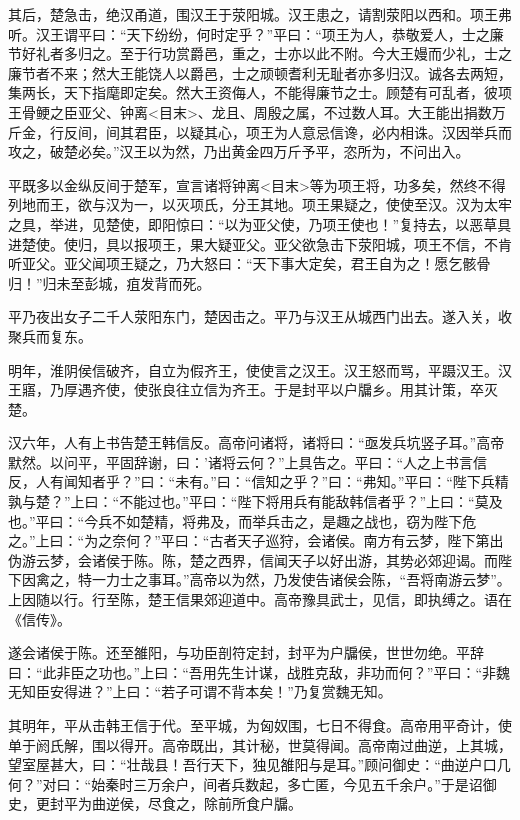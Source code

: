 \documentclass[]{article}
\begin{document}
其后，楚急击，绝汉甬道，围汉王于荥阳城。汉王患之，请割荥阳以西和。项王弗听。汉王谓平曰：``天下纷纷，何时定乎？''平曰：``项王为人，恭敬爱人，士之廉节好礼者多归之。至于行功赏爵邑，重之，士亦以此不附。今大王嫚而少礼，士之廉节者不来；然大王能饶人以爵邑，士之顽顿耆利无耻者亦多归汉。诚各去两短，集两长，天下指麾即定矣。然大王资侮人，不能得廉节之士。顾楚有可乱者，彼项王骨鲠之臣亚父、钟离\textless{}目末\textgreater{}、龙且、周殷之属，不过数人耳。大王能出捐数万斤金，行反间，间其君臣，以疑其心，项王为人意忌信谗，必内相诛。汉因举兵而攻之，破楚必矣。''汉王以为然，乃出黄金四万斤予平，恣所为，不问出入。

平既多以金纵反间于楚军，宣言诸将钟离\textless{}目末\textgreater{}等为项王将，功多矣，然终不得列地而王，欲与汉为一，以灭项氏，分王其地。项王果疑之，使使至汉。汉为太牢之具，举进，见楚使，即阳惊曰：``以为亚父使，乃项王使也！''复持去，以恶草具进楚使。使归，具以报项王，果大疑亚父。亚父欲急击下荥阳城，项王不信，不肯听亚父。亚父闻项王疑之，乃大怒曰：``天下事大定矣，君王自为之！愿乞骸骨归！''归未至彭城，疽发背而死。

平乃夜出女子二千人荥阳东门，楚因击之。平乃与汉王从城西门出去。遂入关，收聚兵而复东。

明年，淮阴侯信破齐，自立为假齐王，使使言之汉王。汉王怒而骂，平蹑汉王。汉王寤，乃厚遇齐使，使张良往立信为齐王。于是封平以户牖乡。用其计策，卒灭楚。

汉六年，人有上书告楚王韩信反。高帝问诸将，诸将曰：``亟发兵坑竖子耳。''高帝默然。以问平，平固辞谢，曰：'诸将云何？''上具告之。平曰：``人之上书言信反，人有闻知者乎？''曰：``未有。''曰：``信知之乎？''曰：``弗知。''平曰：``陛下兵精孰与楚？''上曰：``不能过也。''平曰：``陛下将用兵有能敌韩信者乎？''上曰：``莫及也。''平曰：``今兵不如楚精，将弗及，而举兵击之，是趣之战也，窃为陛下危之。''上曰：``为之奈何？''平曰：``古者天子巡狩，会诸侯。南方有云梦，陛下第出伪游云梦，会诸侯于陈。陈，楚之西界，信闻天子以好出游，其势必郊迎谒。而陛下因禽之，特一力士之事耳。''高帝以为然，乃发使告诸侯会陈，``吾将南游云梦''。上因随以行。行至陈，楚王信果郊迎道中。高帝豫具武士，见信，即执缚之。语在《信传》。

遂会诸侯于陈。还至雒阳，与功臣剖符定封，封平为户牖侯，世世勿绝。平辞曰：``此非臣之功也。''上曰：``吾用先生计谋，战胜克敌，非功而何？''平曰：``非魏无知臣安得进？''上曰：``若子可谓不背本矣！''乃复赏魏无知。

其明年，平从击韩王信于代。至平城，为匈奴围，七日不得食。高帝用平奇计，使单于阏氏解，围以得开。高帝既出，其计秘，世莫得闻。高帝南过曲逆，上其城，望室屋甚大，曰：``壮哉县！吾行天下，独见雒阳与是耳。''顾问御史：``曲逆户口几何？''对曰：``始秦时三万余户，间者兵数起，多亡匿，今见五千余户。''于是诏御史，更封平为曲逆侯，尽食之，除前所食户牖。
\end{document}
